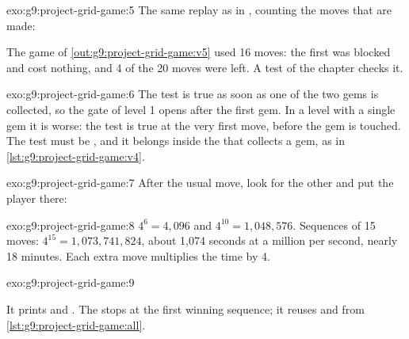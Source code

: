 \begin{solution}{exo:g9:project-grid-game:5}
The same replay as in , counting the moves that are made:

\label{lst:g9:project-grid-game:sol-replay}

The game of \cref{out:g9:project-grid-game:v5} used 16 moves: the first
 was blocked and cost nothing, and 4 of the 20 moves were left. A test
of the chapter checks it.
\end{solution}

\begin{solution}{exo:g9:project-grid-game:6}
The test  is true as soon as one of the two gems is
collected, so the gate of level 1 opens after the first gem. In a level with a
single gem it is worse: the test is true at the very first move, before the gem
is touched. The test must be , and it belongs inside the
 that collects a gem, as in \cref{lst:g9:project-grid-game:v4}.
\end{solution}

\begin{solution}{exo:g9:project-grid-game:7}
After the usual move, look for the other  and put the player there:

\label{lst:g9:project-grid-game:sol-teleport}
\end{solution}

\begin{solution}{exo:g9:project-grid-game:8}
$4^6 = 4{,}096$ and $4^{10} = 1{,}048{,}576$. Sequences of 15 moves:
$4^{15} = 1{,}073{,}741{,}824$, about 1,074 seconds at a million per second,
nearly 18 minutes. Each extra move multiplies the time by 4.
\end{solution}

\begin{solution}{exo:g9:project-grid-game:9}
\label{lst:g9:project-grid-game:sol-checker}

It prints  and . The  stops
at the first winning sequence; it reuses  and 
from \cref{lst:g9:project-grid-game:all}.
\end{solution}

